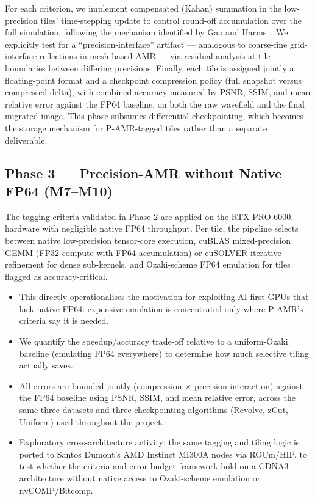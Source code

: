 \documentclass[12pt,a4paper]{article}
\newcommand{\pamr}{P\nobreakdash-AMR}
\begin{document}
For each criterion, we implement compensated (Kahan) summation in the
low-precision tiles' time-stepping update to control round-off accumulation over
the full simulation, following the mechanism identified by Gao and
Harms~\cite{gao2023half}. We explicitly test for a ``precision-interface''
artifact --- analogous to coarse-fine grid-interface reflections in mesh-based
AMR --- via residual analysis at tile boundaries between differing precisions.
Finally, each tile is assigned jointly a floating-point format and a checkpoint
compression policy (full snapshot versus compressed delta), with combined
accuracy measured by PSNR, SSIM, and mean relative error against the FP64
baseline, on both the raw wavefield and the final migrated image. This phase
subsumes differential checkpointing, which becomes the storage mechanism for
\pamr{}-tagged tiles rather than a separate deliverable.

\subsection{Phase 3 --- Precision-AMR without Native FP64 (M7--M10)}

The tagging criteria validated in Phase 2 are applied on the RTX PRO 6000,
hardware with negligible native FP64 throughput. Per tile, the pipeline selects
between native low-precision tensor-core execution, cuBLAS mixed-precision GEMM
(FP32 compute with FP64 accumulation) or cuSOLVER iterative refinement for dense
sub-kernels, and Ozaki-scheme FP64 emulation for tiles flagged as
accuracy-critical.

\begin{itemize}
  \item This directly operationalises the motivation for exploiting AI-first GPUs
        that lack native FP64: expensive emulation is concentrated only where
        \pamr{}'s criteria say it is needed.
  \item We quantify the speedup/accuracy trade-off relative to a uniform-Ozaki
        baseline (emulating FP64 everywhere) to determine how much selective
        tiling actually saves.
  \item All errors are bounded jointly (compression $\times$ precision
        interaction) against the FP64 baseline using PSNR, SSIM, and mean
        relative error, across the same three datasets and three checkpointing
        algorithms (Revolve, zCut, Uniform) used throughout the project.
  \item Exploratory cross-architecture activity: the same tagging and tiling logic
        is ported to Santos Dumont's AMD Instinct MI300A nodes via ROCm/HIP, to
        test whether the criteria and error-budget framework hold on a CDNA3
        architecture without native access to Ozaki-scheme emulation or
        nvCOMP/Bitcomp.
\end{itemize}
\end{document}
